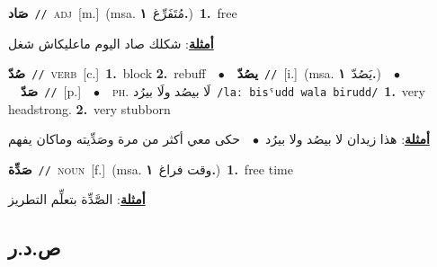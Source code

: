 \documentclass[10pt,a4paper,twoside]{article} %
\begin{document}
\begin{multicols}{2}
{{{{{{{{{{{{{\setlength\topsep{0pt}\textbf{\foreignlanguage{arabic}{صَاد}}\ {\color{gray}\texttt{//}\color{black}}\ \textsc{adj}\ [m.]\ \color{gray}(msa. \foreignlanguage{arabic}{مُتَفَرِّغ}~\foreignlanguage{arabic}{\textbf{١.}})\color{black}\ \textbf{1.}~free\  \begin{flushright}\color{gray}\foreignlanguage{arabic}{\textbf{\underline{\foreignlanguage{arabic}{أمثلة}}}: شكلك صاد اليوم ماعليكاش شغل}\end{flushright}\color{black}} \vspace{2mm}

{\setlength\topsep{0pt}\textbf{\foreignlanguage{arabic}{صُدّ}}\ {\color{gray}\texttt{//}\color{black}}\ \textsc{verb}\ [c.]\ \textbf{1.}~block  \textbf{2.}~rebuff\ \ $\bullet$\ \ \setlength\topsep{0pt}\textbf{\foreignlanguage{arabic}{يصُدّ}}\ {\color{gray}\texttt{//}\color{black}}\ [i.]\ \color{gray}(msa. \foreignlanguage{arabic}{يَصُدّ}~\foreignlanguage{arabic}{\textbf{١.}})\color{black}\ \ $\bullet$\ \ \setlength\topsep{0pt}\textbf{\foreignlanguage{arabic}{صَدّ}}\ {\color{gray}\texttt{//}\color{black}}\ [p.]\ \ $\bullet$\ \ \textsc{ph.} \color{gray} \foreignlanguage{arabic}{لَا بيصُد ولَا بيرُد}\color{black}\ {\color{gray}\texttt{/{\sffamily laː bisˤudd wala birudd}/}\color{black}}\ \textbf{1.}~very headstrong.  \textbf{2.}~very stubborn\  \begin{flushright}\color{gray}\foreignlanguage{arabic}{\textbf{\underline{\foreignlanguage{arabic}{أمثلة}}}: هذا زيدان لا بيصُد ولا بيرُد\ $\bullet$\ \  حكى معي أكثر من مرة وصَدِّيته وماكان يفهم}\end{flushright}\color{black}} \vspace{2mm}

{\setlength\topsep{0pt}\textbf{\foreignlanguage{arabic}{صَدِّة}}\ {\color{gray}\texttt{//}\color{black}}\ \textsc{noun}\ [f.]\ \color{gray}(msa. \foreignlanguage{arabic}{وقت فراغ}~\foreignlanguage{arabic}{\textbf{١.}})\color{black}\ \textbf{1.}~free time\  \begin{flushright}\color{gray}\foreignlanguage{arabic}{\textbf{\underline{\foreignlanguage{arabic}{أمثلة}}}: الصَّدِّة بتعلِّم التطريز}\end{flushright}\color{black}} \vspace{2mm}

\vspace{-3mm}
\subsection*{\color{blue}\foreignlanguage{arabic}{ص.د.ر}\color{blue}{}} 

}}}}}}}}}}}}
\end{multicols}
\end{document}
